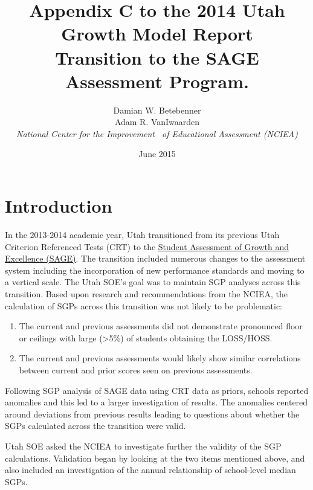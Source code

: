 \documentclass[12pt]{article}
\begin{document}
\title{\textsf{\LARGE Appendix C to the 2014 Utah Growth Model Report  \\\medskip Transition to the SAGE Assessment Program. }}
\author{  Damian W. Betebenner    \\   Adam R. VanIwaarden    \\   \emph{National Center for the Improvement \ of Educational Assessment (NCIEA)}   }

 \date{June 2015} 

\maketitle

\newpage


\section{Introduction}\label{introduction}

In the 2013-2014 academic year, Utah transitioned from its previous Utah
Criterion Referenced Tests (CRT) to the
\href{http://www.schools.utah.gov/assessment/SAGE.aspx}{Student
Assessment of Growth and Excellence (SAGE)}. The transition included
numerous changes to the assessment system including the incorporation of
new performance standards and moving to a vertical scale. The Utah SOE's
goal was to maintain SGP analyses across this transition. Based upon
research and recommendations from the NCIEA, the calculation of SGPs
across this transition was not likely to be problematic:

\begin{enumerate}
\def\labelenumi{\arabic{enumi}.}
\itemsep1pt\parskip0pt
\item
  The current and previous assessments did not demonstrate pronounced
  floor or ceilings with large (\textgreater{}5\%) of students obtaining
  the LOSS/HOSS.
\item
  The current and previous assessments would likely show similar
  correlations between current and prior scores seen on previous
  assessments.
\end{enumerate}

Following SGP analysis of SAGE data using CRT data as priors, schools
reported anomalies and this led to a larger investigation of results.
The anomalies centered around deviations from previous results leading
to questions about whether the SGPs calculated across the transition
were valid.

Utah SOE asked the NCIEA to investigate further the validity of the SGP
calculations. Validation began by looking at the two items mentioned
above, and also included an investigation of the annual relationship of
school-level median SGPs.
\end{document}
